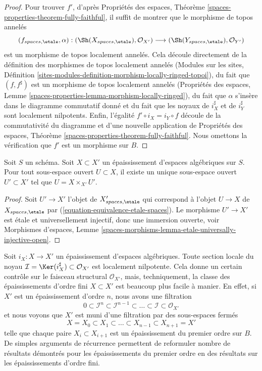 \begin{proof}
Pour trouver $f'$, d'après
Propriétés des espaces, Théorème \ref{spaces-properties-theorem-fully-faithful},
il suffit de montrer que le morphisme de topos annelés
$$
(f_{spaces, \etale}, \alpha) :
(\Sh(X_{spaces, \etale}), \mathcal{O}_{X'})
\longrightarrow
(\Sh(Y_{spaces, \etale}), \mathcal{O}_{Y'})
$$
est un morphisme de topos localement annelés. Cela découle directement
de la définition des morphismes de topos localement annelés
(Modules sur les sites,
Définition \ref{sites-modules-definition-morphism-locally-ringed-topoi}),
du fait que $(f, f^\sharp)$ est un morphisme de topos localement annelés
(Propriétés des espaces,
Lemme \ref{spaces-properties-lemma-morphism-locally-ringed}),
du fait que $\alpha$ s'insère dans le diagramme commutatif donné et
du fait que les noyaux de $i_X^\sharp$ et de $i_Y^\sharp$ sont
localement nilpotents. Enfin, l'égalité $f' \circ i_X = i_Y \circ f$
découle de la commutativité du diagramme et d'une nouvelle application de
Propriétés des espaces, Théorème \ref{spaces-properties-theorem-fully-faithful}.
Nous omettons la vérification que $f'$ est un morphisme sur $B$.
\end{proof}

\begin{lemma}
\label{lemma-open-subspace-thickening}
Soit $S$ un schéma. Soit $X \subset X'$ un épaississement
d'espaces algébriques sur $S$. Pour tout sous-espace ouvert $U \subset X$, il
existe un unique sous-espace ouvert $U' \subset X'$ tel que
$U = X \times_{X'} U'$.
\end{lemma}

\begin{proof}
Soit $U' \to X'$ l'objet de $X'_{spaces, \etale}$
qui correspond à l'objet $U \to X$ de $X_{spaces, \etale}$
par (\ref{equation-equivalence-etale-spaces}). Le morphisme
$U' \to X'$ est étale et universellement injectif, donc une immersion ouverte, voir
Morphismes d'espaces,
Lemme \ref{spaces-morphisms-lemma-etale-universally-injective-open}.
\end{proof}

\noindent
Soit $i_X : X \to X'$ un épaississement d'espaces algébriques. Toute section locale
du noyau $\mathcal{I} = \Ker(i_X^\sharp) \subset \mathcal{O}_{X'}$ est
localement nilpotente. Cela donne un certain contrôle sur le faisceau structural
$\mathcal{O}_{X'}$, mais, techniquement, la classe des épaississements d'ordre fini
$X \subset X'$ est beaucoup plus facile à manier.
En effet, si $X'$ est un épaississement d'ordre $n$, nous avons une filtration
$$
0 \subset \mathcal{I}^n \subset \mathcal{I}^{n - 1} \subset
\ldots \subset \mathcal{I} \subset \mathcal{O}_{X'}
$$
et nous voyons que $X'$ est muni d'une filtration par des sous-espaces fermés
$$
X = X_0 \subset X_1 \subset \ldots \subset X_{n - 1} \subset X_{n + 1} = X'
$$
telle que chaque paire $X_i \subset X_{i + 1}$ est un épaississement du premier ordre
sur $B$. De simples arguments de récurrence permettent de reformuler nombre de résultats démontrés pour les
épaississements du premier ordre en des résultats sur les épaississements d'ordre fini.

